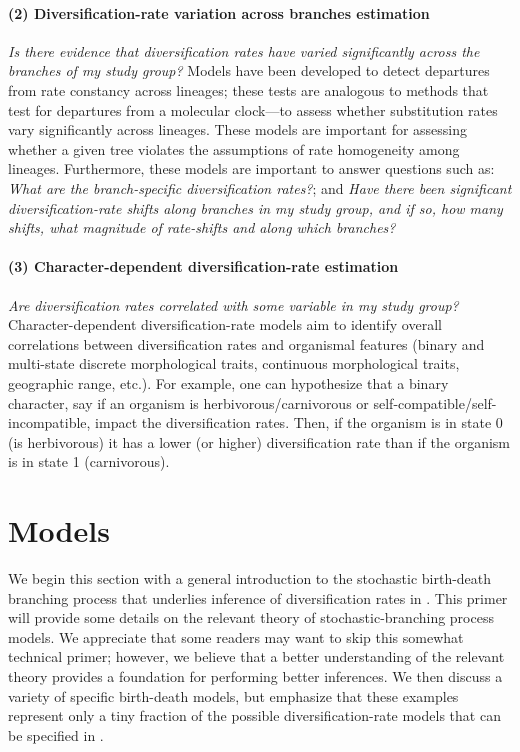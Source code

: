 \paragraph{(2) Diversification-rate variation across branches estimation}\textit{Is there evidence that diversification rates have varied significantly across the branches of my study group?}
Models have been developed to detect departures from rate constancy across lineages; these tests are analogous to methods that test for departures from a molecular clock---\IE to assess whether substitution rates vary significantly across lineages.
These models are important for assessing whether a given tree violates the assumptions of rate homogeneity among lineages.
Furthermore, these models are important to answer questions such as:
\textit{What are the branch-specific diversification rates?}; and
\textit{Have there been significant diversification-rate shifts along branches in my study group, and if so, how many shifts, what magnitude of rate-shifts and along which branches?}


\paragraph{(3) Character-dependent diversification-rate estimation}\textit{Are diversification rates correlated with some variable in my study group?}
Character-dependent diversification-rate models aim to identify overall correlations between diversification rates and organismal features (binary and multi-state discrete morphological traits, continuous morphological traits, geographic range, etc.).
For example, one can hypothesize that a binary character, say if an organism is herbivorous/carnivorous or self-compatible/self-incompatible, impact the diversification rates.
Then, if the organism is in state 0 (\EG is herbivorous) it has a lower (or higher) diversification rate than if the organism is in state 1 (\EG carnivorous).


\section{Models}\label{sec:Models}

We begin this section with a general introduction to the stochastic birth-death branching process that underlies inference of diversification rates in \RevBayes.
This primer will provide some details on the relevant theory of stochastic-branching process models.
We appreciate that some readers may want to skip this somewhat technical primer; however, we believe that a better understanding of the relevant theory provides a foundation for performing better inferences.
We then discuss a variety of specific birth-death models, but emphasize that these examples represent only a tiny fraction of the possible diversification-rate models that can be specified in \RevBayes.

